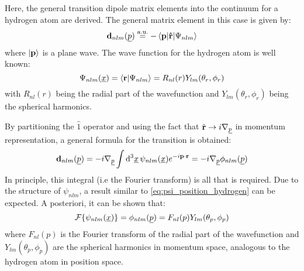 
\label{sec:dipolematrixelements}

Here, the general transition dipole matrix elements into the continuum for a hydrogen atom are derived.     %
The general matrix element in this case is given by:
\begin{equation*}
    \mathbf{d}_{nlm}(\underline{p}) \stackrel{\mathrm{a.u.}}{=} -\braket{\mathbf{p}|\mathbf{\hat{r}}|\Psi_{nlm}}
\end{equation*}
where $\ket{\mathbf{p}}$ is a plane wave.
The wave function for the hydrogen atom is well known:
\begin{equation}
    \Psi_{nlm}(\underline{x}) = \braket{\mathbf{r}|\Psi_{nlm}} = R_{nl}(r)Y_{lm}(\theta_r, \phi_r) \label{eq:psi_position_hydrogen}
\end{equation}
with $R_{nl}(r)$ being the radial part of the wavefunction and $Y_{lm}(\theta_r, \phi_r)$ being the spherical harmonics.

By partitioning the $\hat{1}$ operator and using the fact that $\hat{\mathbf{r}} \rightarrow i\nabla_{\underline{p}}$ %
in momentum representation, a general formula for the transition is obtained:
\begin{equation*}
    \mathbf{d}_{nlm}(\underline{p}) = -i\nabla_{\underline{p}}\int \mathrm{d}^3\underline{x}\,\psi_{nlm}(\underline{x}) e^{-i\mathbf{p}\cdot\mathbf{r}} = -i\nabla_{\underline{p}}\phi_{nlm}(\underline{p})
\end{equation*}
In principle, this integral (i.e the Fourier transform) is all that is required.
Due to the structure of $\psi_{nlm}$, a result similar to \eqref{eq:psi_position_hydrogen} can be expected.
A posteriori, it can be shown that:
\begin{equation*}
    \mathcal{F}\{\psi_{nlm}(\underline{x})\} = \phi_{nlm}(\underline{p}) = F_{nl}(p)Y_{lm}(\theta_p, \phi_p)
\end{equation*}
where $F_{nl}(p)$ is the Fourier transform of the radial part of the wavefunction and $Y_{lm}(\theta_p, \phi_p)$ are the spherical harmonics in momentum space, analogous to the hydrogen atom in position space.







